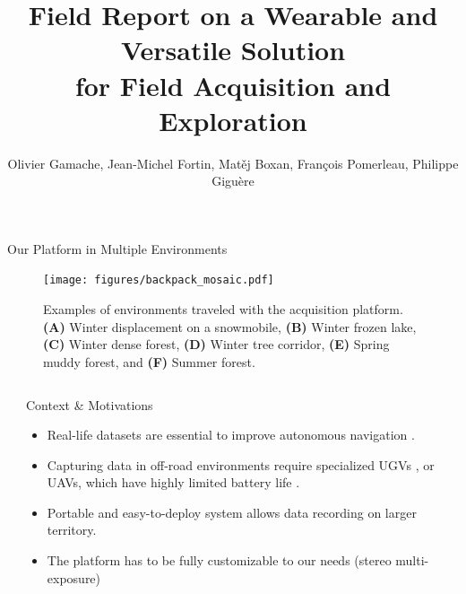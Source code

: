 \documentclass[final,hyperref={pdfpagelabels=false}]{beamer}
\title{\huge Field Report on a Wearable and Versatile Solution \\ for Field Acquisition and Exploration} %
\author{\normalsize Olivier Gamache, Jean-Michel Fortin, Mat\v ej Boxan, François Pomerleau, Philippe Giguère} %
\begin{document}

\begin{frame}[t] %

\begin{block}{Our Platform in Multiple Environments}
	\begin{figure}
	\texttt{[image: figures/backpack\_mosaic.pdf]}%
		\captionsetup{width = 0.975\linewidth, justification=justified, name=Figure 1}
		\caption{
			Examples of environments traveled with the acquisition platform. \textbf{(A)} Winter displacement on a snowmobile, \textbf{(B)} Winter frozen lake, \textbf{(C)} Winter dense forest, \textbf{(D)} Winter tree corridor, \textbf{(E)} Spring muddy forest, and \textbf{(F)} Summer forest.
		}
		\label{fig:mosaic}
	\end{figure}
\end{block}
	
\begin{columns}[t] %


\begin{column}{.001\linewidth}\end{column} %

\begin{column}{.484\textwidth} %

\vspace{-12.5mm}


\begin{block}{Context \& Motivations}
\begin{itemize}
	\item Real-life datasets are essential to improve autonomous navigation \cite{liu2024botanicgarden}.
	\item Capturing data in off-road environments require specialized \acp{UGV} \cite{Baril2022}, or \ac{UAVs}, which have highly limited battery life \cite{mozaffari2019tutorial}.
	\item Portable and easy-to-deploy system allows data recording on larger territory.
	\item The platform has to be fully customizable to our needs (stereo multi-exposure)
\end{itemize}
\end{block}


\end{column}
\end{columns}
\end{frame}
\end{document}
